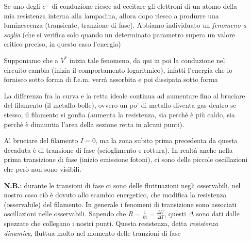 \documentclass{article}
\begin{document}
Se uno degli $e^-$ di conduzione riesce ad eccitare gli elettroni di un atomo della mia resistenza interna alla lampadina, allora dopo riesco a produrre una luminescenza (transiente, tranzione di fase). 
Abbiamo individuato un \textit{fenomeno a soglia} (che si verifica solo quando un determinato parametro supera un valore critico preciso, in questo caso l'energia)

Supponiamo che a $V^*$ inizia tale fenomeno, da qui in poi la conduzione nel circuito cambia (inizia il comportamento logaritmico), infatti l'energia che io fornisco sotto forma di f.e.m. verrà assorbita e poi dissipata sotto forma 

La differenza fra la curva e la retta ideale continua ad aumentare fino al bruciare del filamento (il metallo bolle), ovvero un po' di metallo diventa gas dentro se stesso, 
il filamento si gonfia (aumenta la resistenza, sia perchè è più caldo, sia perchè è diminutia l'area della sezione retta in alcuni punti).

Al bruciare del filamento $I=0$, ma la zona subito prima precedenta da questa decaduta è di transione di fase (scioglimento e rottura). In realtà anche nella prima transizione di fase (inizio emissione fotoni), ci sono delle 
piccole oscillazioni che però non sono visibili. 

\textbf{N.B.}: durante le transioni di fase ci sono delle fluttuazioni negli osservabili, nel nostro caso ciò è dovuto allo scambio energetico, che modifica la resistenza (osservabile) del filamento.
In generale i fenomeni di transizione sono associati oscillazioni nelle osservabili. 
Sapendo che $R=\frac{1}{m}=\frac{\Delta V}{\Delta I}$, questi $\Delta$ sono dati dalle spezzate che collegano i nostri punti.
Questa resistenza, detta \textit{resistenza dinamica}, fluttua molto nel momento delle tranzioni di fase 





\begin{center}
\end{center}
\end{document}
